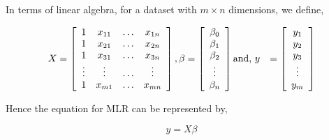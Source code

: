 \documentclass{beamer}
\begin{document}
    \begin{frame}
        In terms of linear algebra, for a dataset with \(m\times n\) dimensions, we define,

        \begin{align*}
            X&=\left[\begin{array}{c c c c}
                1 & x_{11} & \hdots & x_{1n}\\
                1 & x_{21} & \hdots & x_{2n}\\
                1 & x_{31} & \hdots & x_{3n}\\
                \vdots & \vdots & \hdots & \vdots\\
                1 & x_{m1} & \hdots & x_{mn}
            \end{array}\right],
            \beta=\left[\begin{array}{c}
                \beta_0\\
                \beta_1\\
                \beta_2\\
                \vdots\\
                \beta_n
            \end{array}\right]\textnormal{and, }
            y&=\left[\begin{array}{c}
                y_1\\
                y_2\\
                y_3\\
                \vdots\\
                y_m
            \end{array}\right]
        \end{align*}

        Hence the equation for MLR can be represented by,

        \begin{equation}
            \boxed{y=X\beta}
        \end{equation}
    \end{frame}
\end{document}
